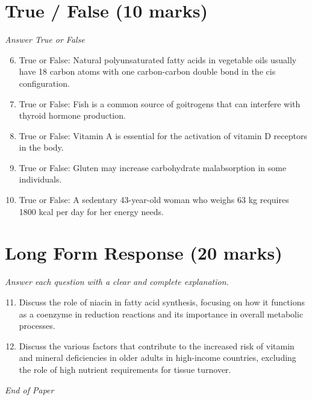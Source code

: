 \documentclass[12pt]{article}
\begin{document}
\section*{True / False (10 marks)}
\textit{Answer True or False}
\begin{enumerate}[label=\arabic*.]
\setcounter{enumi}{5}
\item True or False: Natural polyunsaturated fatty acids in vegetable oils usually have 18 carbon atoms with one carbon-carbon double bond in the cis configuration.
\item True or False: Fish is a common source of goitrogens that can interfere with thyroid hormone production.
\item True or False: Vitamin A is essential for the activation of vitamin D receptors in the body.
\item True or False: Gluten may increase carbohydrate malabsorption in some individuals.
\item True or False: A sedentary 43-year-old woman who weighs 63 kg requires 1800 kcal per day for her energy needs.
\end{enumerate}

\section*{Long Form Response (20 marks)}
\textit{Answer each question with a clear and complete explanation.}
\begin{enumerate}[label=\arabic*.]
\setcounter{enumi}{10}
\item Discuss the role of niacin in fatty acid synthesis, focusing on how it functions as a coenzyme in reduction reactions and its importance in overall metabolic processes.
\item Discuss the various factors that contribute to the increased risk of vitamin and mineral deficiencies in older adults in high-income countries, excluding the role of high nutrient requirements for tissue turnover.
\end{enumerate}

\vfill
\noindent\textit{End of Paper}
\end{document}
